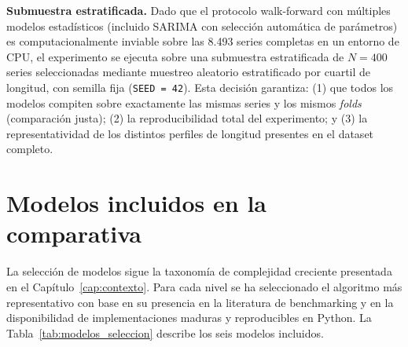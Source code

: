 \textbf{Submuestra estratificada.} Dado que el protocolo walk-forward con múltiples modelos estadísticos (incluido SARIMA con selección automática de parámetros) es computacionalmente inviable sobre las 8.493 series completas en un entorno de CPU, el experimento se ejecuta sobre una submuestra estratificada de $N = 400$ series seleccionadas mediante muestreo aleatorio estratificado por cuartil de longitud, con semilla fija (\texttt{SEED = 42}). Esta decisión garantiza: (1) que todos los modelos compiten sobre exactamente las mismas series y los mismos \textit{folds} (comparación justa); (2) la reproducibilidad total del experimento; y (3) la representatividad de los distintos perfiles de longitud presentes en el dataset completo.

\section{Modelos incluidos en la comparativa}
\label{sec:modelos_comparativa}

La selección de modelos sigue la taxonomía de complejidad creciente presentada en el Capítulo~\ref{cap:contexto}. Para cada nivel se ha seleccionado el algoritmo más representativo con base en su presencia en la literatura de benchmarking y en la disponibilidad de implementaciones maduras y reproducibles en Python. La Tabla~\ref{tab:modelos_seleccion} describe los seis modelos incluidos.

